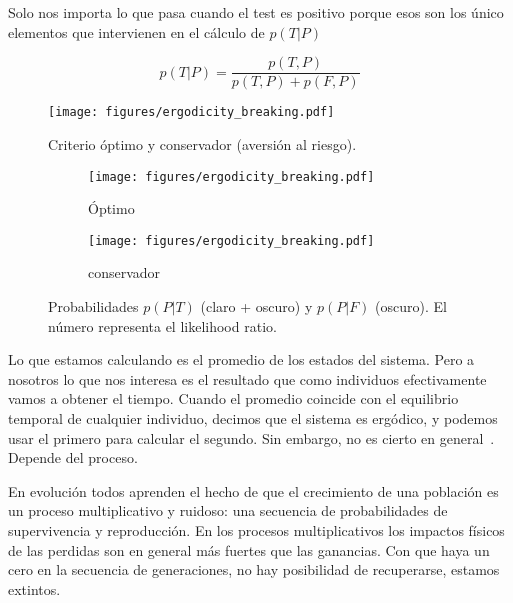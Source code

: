 \documentclass[a4paper,10pt]{article}
\begin{document}
Solo nos importa lo que pasa cuando el test es positivo porque esos son los \'unico elementos que intervienen en el c\'alculo de $p(T|P)$

\begin{equation}
 p(T|P) = \frac{p(T,P)}{p(T,P)+p(F,P)}
\end{equation}

\begin{figure}[H]
\centering
  \texttt{[image: figures/ergodicity\_breaking.pdf]}
  \caption{Criterio \'optimo y conservador (aversi\'on al riesgo).}
  \label{}
\end{figure}

\begin{figure}[H]
\centering
  \begin{subfigure}[t]{0.48\textwidth}
  \texttt{[image: figures/ergodicity\_breaking.pdf]}
  \caption{\'Optimo}
  \end{subfigure}
  \begin{subfigure}[t]{0.48\textwidth}
  \texttt{[image: figures/ergodicity\_breaking.pdf]}
  \caption{conservador}
  \end{subfigure}
  \caption{Probabilidades $p(P|T)$ (claro + oscuro) y $p(P|F)$ (oscuro). El n\'umero representa el likelihood ratio.}
  \label{}
\end{figure}



Lo que estamos calculando es el promedio de los estados del sistema.
Pero a nosotros lo que nos interesa es el resultado que como individuos efectivamente vamos a obtener el tiempo.
Cuando el promedio coincide con el equilibrio temporal de cualquier individuo, decimos que el sistema es ergódico, y podemos usar el primero para calcular el segundo.
Sin embargo, no es cierto en general~\cite{peters2019-ergodicityEconomics}.
Depende del proceso.

En evoluci\'on todos aprenden el hecho de que el crecimiento de una poblaci\'on es un proceso multiplicativo y ruidoso: una secuencia de probabilidades de supervivencia y reproducci\'on.
En los procesos multiplicativos los impactos f\'isicos de las perdidas son en general m\'as fuertes que las ganancias.
Con que haya un cero en la secuencia de generaciones, no hay posibilidad de recuperarse, estamos extintos.




{\scriptsize


}
\end{document}
